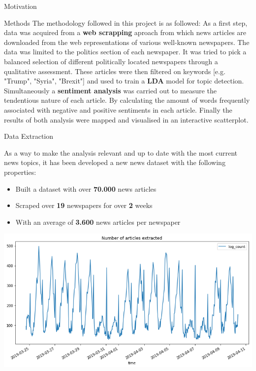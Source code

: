 \documentclass[final]{beamer}
\newlength{\onecolwid}
\begin{document}
\begin{frame}[t]
\begin{columns}[t]
\begin{column}{\onecolwid}
\begin{block}{Motivation}
\end{block}


\begin{block}{Methods}
    The methodology followed in this project is as followed: As a first step, data was acquired from a \textbf{web scrapping} aproach from which news articles are downloaded from the web representations of various well-known newspapers. The data was limited to the politics section of each newspaper. It was tried to pick a balanced selection of different politically located newspapers through a qualitative assessment.
    These articles were then filtered on keywords [e.g. "Trump", "Syria", "Brexit"] and used to train a \textbf{LDA} model for topic detection. Simultaneously a \textbf{sentiment analysis} was carried out to measure the tendentious nature of each article. By calculating the amount of words frequently associated with negative and positive sentiments in each article.
    Finally the results of both analysis were mapped and visualised in an interactive scatterplot. 
\end{block}
    


\begin{block}{Data Extraction}

    As a way to make the analysis relevant and up to date with the most current news topics,
    it has been developed a new news dataset with the following properties:

    \begin{itemize}
        \item Built a dataset with over \textbf{70.000} news articles
        \item Scraped over \textbf{19} newspapers for over \textbf{2} weeks
        \item With an average of \textbf{3.600} news articles per newspaper
    \end{itemize}

    \hfill\includegraphics{log_extraction.png}\hspace*{\fill}


\end{block}
\end{column}
\end{columns}
\end{frame}
\end{document}
